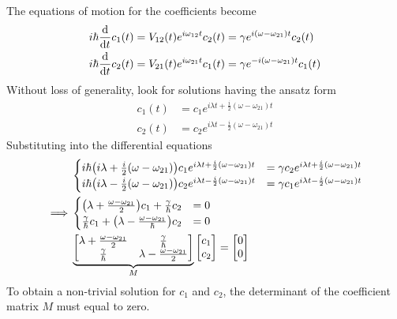 \documentclass[12pt,a4paper,titlepage]{article}
\begin{document}
The equations of motion for the coefficients become
\begin{equation}
\begin{aligned}
i\hbar\dv{t}c_{1}(t)&=V_{12}(t)e^{i\omega_{12}t}c_{2}(t)=\gamma e^{i(\omega-\omega_{21})t}c_{2}(t)\\
i\hbar\dv{t}c_{2}(t)&=V_{21}(t)e^{i\omega_{21}t}c_{1}(t)=\gamma e^{-i(\omega-\omega_{21})t}c_{1}(t)
\end{aligned}
\end{equation}
Without loss of generality, look for solutions having the ansatz form
\begin{equation}
\begin{aligned}
c_{1}(t)&=c_{1}e^{i\lambda t+\frac{i}{2}(\omega-\omega_{21})t}\\
c_{2}(t)&=c_{2}e^{i\lambda t-\frac{i}{2}(\omega-\omega_{21})t}
\end{aligned}
\end{equation}
Substituting into the differential equations
\begin{equation}
\begin{aligned}
&\begin{cases}
i\hbar\qty(i\lambda+\frac{i}{2}(\omega-\omega_{21}))c_{1}e^{i\lambda t+\frac{i}{2}(\omega-\omega_{21})t}&=\gamma c_{2}e^{i\lambda t+\frac{i}{2}(\omega-\omega_{21})t}\\
i\hbar\qty(i\lambda-\frac{i}{2}(\omega-\omega_{21}))c_{2}e^{i\lambda t-\frac{i}{2}(\omega-\omega_{21})t}&=\gamma c_{1}e^{i\lambda t-\frac{i}{2}(\omega-\omega_{21})t}
\end{cases}\\
\implies &\begin{cases}
\qty(\lambda+\frac{\omega-\omega_{21}}{2})c_{1}+\frac{\gamma}{\hbar}c_{2}&=0\\
\frac{\gamma}{\hbar}c_{1}+\qty(\lambda-\frac{\omega-\omega_{21}}{\hbar})c_{2}&=0
\end{cases}\\
&\underbrace{\mqty[\lambda+\frac{\omega-\omega_{21}}{2} & \frac{\gamma}{\hbar} \\ \frac{\gamma}{\hbar} & \lambda-\frac{\omega-\omega_{21}}{2}]}_{M}\mqty[c_{1} \\ c_{2}] = \mqty[0 \\ 0]
\end{aligned}
\end{equation}
To obtain a non-trivial solution for $c_{1}$ and $c_{2}$, the determinant of the coefficient matrix $M$ must equal to zero.
\end{document}
